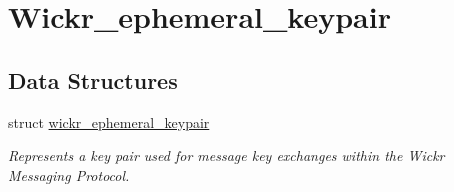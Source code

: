 \hypertarget{group__wickr__ephemeral__keypair}{}\section{Wickr\+\_\+ephemeral\+\_\+keypair}
\label{group__wickr__ephemeral__keypair}
\subsection*{Data Structures}
\begin{DoxyCompactItemize}
\item 
struct \hyperlink{structwickr__ephemeral__keypair}{wickr\+\_\+ephemeral\+\_\+keypair}
\begin{DoxyCompactList}\small\item\em Represents a key pair used for message key exchanges within the Wickr Messaging Protocol. \end{DoxyCompactList}\end{DoxyCompactItemize}
